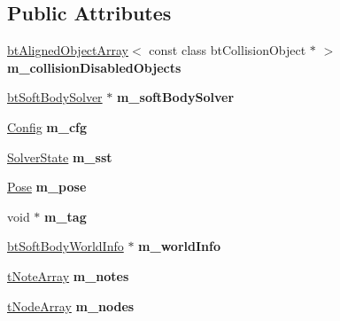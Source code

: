 \subsection*{Public Attributes}
\begin{DoxyCompactItemize}
\item 
\mbox{\label{classbtSoftBody_a60857c2994e206fd476b4f581c468c8d}} 
\hyperlink{classbtAlignedObjectArray}{bt\+Aligned\+Object\+Array}$<$ const class bt\+Collision\+Object $\ast$ $>$ {\bfseries m\+\_\+collision\+Disabled\+Objects}
\item 
\mbox{\label{classbtSoftBody_afa4f3a40b43a4e10d77e52ecbb3bf571}} 
\hyperlink{classbtSoftBodySolver}{bt\+Soft\+Body\+Solver} $\ast$ {\bfseries m\+\_\+soft\+Body\+Solver}
\item 
\mbox{\label{classbtSoftBody_a6c8ea8006fb5e716361a7d66cf00daab}} 
\hyperlink{structbtSoftBody_1_1Config}{Config} {\bfseries m\+\_\+cfg}
\item 
\mbox{\label{classbtSoftBody_a329525a55d20b3a388b92b234fd15b5f}} 
\hyperlink{structbtSoftBody_1_1SolverState}{Solver\+State} {\bfseries m\+\_\+sst}
\item 
\mbox{\label{classbtSoftBody_a3c1d3c3e9f60e3d97f08245a82fa0ed3}} 
\hyperlink{structbtSoftBody_1_1Pose}{Pose} {\bfseries m\+\_\+pose}
\item 
\mbox{\label{classbtSoftBody_abd99c0f3e6d2a2e227d38421374ce173}} 
void $\ast$ {\bfseries m\+\_\+tag}
\item 
\mbox{\label{classbtSoftBody_a4a2ef515395ec9c49b1c550bb20dc724}} 
\hyperlink{structbtSoftBodyWorldInfo}{bt\+Soft\+Body\+World\+Info} $\ast$ {\bfseries m\+\_\+world\+Info}
\item 
\mbox{\label{classbtSoftBody_ab2d4d22ffbeed6ae64366f94e1e72fa2}} 
\hyperlink{classbtAlignedObjectArray}{t\+Note\+Array} {\bfseries m\+\_\+notes}
\item 
\mbox{\label{classbtSoftBody_ad53c95f39d517c1b72db24f175e92fb5}} 
\hyperlink{classbtAlignedObjectArray}{t\+Node\+Array} {\bfseries m\+\_\+nodes}

\end{DoxyCompactItemize}
